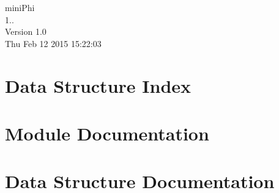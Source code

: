 \documentclass[twoside]{book}
\newcommand{\clearemptydoublepage}{%
  \newpage{\pagestyle{empty}\cleardoublepage}%
}
\begin{document}
\hypersetup{pageanchor=false}
\begin{titlepage}
\vspace*{7cm}
\begin{center}%
{\Large mini\-Phi \\[1ex]\large 1.. }\\
\vspace*{1cm}
{\large Version 1.0}\\
\vspace*{0.5cm}
{\small Thu Feb 12 2015 15:22:03}\\
\end{center}
\end{titlepage}
\clearemptydoublepage
\tableofcontents
\clearemptydoublepage
{}
\hypersetup{pageanchor=true}

\chapter{Data Structure Index}

\chapter{Module Documentation}















\chapter{Data Structure Documentation}



























\newpage
{}
{}
\printindex
\end{document}
